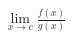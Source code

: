\documentclass[preview]{standalone}
\begin{document}
\begin{align*}
\lim_{x \to c} \frac{f(x)}{g(x)}
\end{align*}
\end{document}
